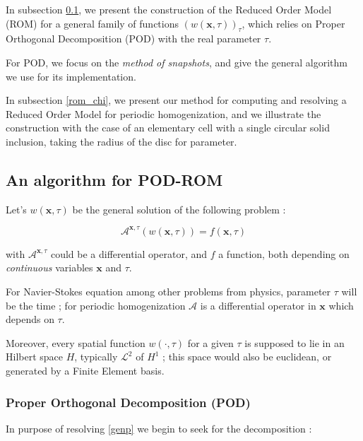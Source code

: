 \ligneinter
In subsection \ref{pod_rom}, we present the construction of the Reduced Order Model (ROM) for a general family of functions $(w(\mathbf{x},\tau))_{\tau}$, %
which relies on Proper Orthogonal Decomposition (POD) with the real parameter $\tau$.

\par
For POD, we focus on the \emph{method of snapshots}, and give the general algorithm we use for its implementation.

\par
In subsection \ref{rom_chi}, we present our method for computing and resolving a Reduced Order Model for periodic homogenization, %
and we illustrate the construction with the case of an elementary cell with a single circular solid inclusion, %
taking the radius of the disc for parameter.

\subsection{An algorithm for POD-ROM}\label{pod_rom}

Let's $w(\mathbf{x},\tau)$ be the general solution of the following problem :

\begin{equation}\label{genp}
\mathcal{A}^{\mathbf{x},\tau}\left(w(\mathbf{x},\tau)\right)=f(\mathbf{x},\tau)
\end{equation}

with $\mathcal{A}^{\mathbf{x},\tau}$ could be a differential operator, %
and $f$ a function, both depending on \emph{continuous} variables $\mathbf{x}$ and $\tau$.

\par
For Navier-Stokes equation among other problems from physics, parameter $\tau$ will be the time ; %
for periodic homogenization $\mathcal{A}$ is a differential operator in $\mathbf{x}$ which depends on $\tau$.

\etoile
Moreover, every spatial function $w(\cdot,\tau)$ for a given $\tau$ is supposed to lie in an Hilbert space $H$, %
typically $\mathcal{L}^2$ of $H^1$ ; this space would also be euclidean, or generated by a Finite Element basis.

\subsubsection{Proper Orthogonal Decomposition (POD)}

In purpose of resolving \ref{genp} we begin to seek for the decomposition :

